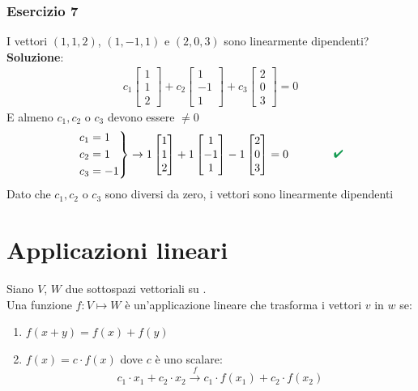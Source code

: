 \documentclass[italian]{article}
\renewcommand{\checkmark}{\textcolor{ForestGreen}{\text{$\qquad$\ding{52}}}}
\newcommand{\ins}[1]{\text{$\mathbb{#1}$}}
\begin{document}
\subsubsection{Esercizio 7}
I vettori $(1,1,2)$, $(1,-1,1)$ e $(2,0,3)$ sono linearmente dipendenti?\\[2mm]
\textbf{Soluzione}:
\begin{gather*}
c_1 
\begin{bmatrix}
	1 \\ 1 \\ 2
\end{bmatrix}
+
c_2
\begin{bmatrix}
	1 \\ -1 \\ 1
\end{bmatrix}
+
c_3
\begin{bmatrix}
	2 \\ 0 \\ 3
\end{bmatrix}
= 0
\end{gather*}
E almeno $c_1,c_2$ o $c_3$ devono essere $\neq 0$
\begin{gather*}
\begin{rcases*}
c_1 = 1\\
c_2 = 1 \\
c_3 = -1
\end{rcases*}
\to
1
\begin{bmatrix}
1 \\ 1 \\ 2
\end{bmatrix}
+
1
\begin{bmatrix}
1 \\ -1 \\ 1
\end{bmatrix}
-1
\begin{bmatrix}
2 \\ 0 \\ 3
\end{bmatrix}
= 0 \qquad \checkmark
\end{gather*}
Dato che $c_1,c_2$ o $c_3$ sono diversi da zero, i vettori sono linearmente dipendenti 

\newpage
\section{Applicazioni lineari}
Siano $V$, $W$ due sottospazi vettoriali su \ins{K}.\\
Una funzione $f: V \longmapsto W$ è un'applicazione lineare che trasforma i vettori $v$ in $w$ se:
\begin{enumerate}
	\item $f(x+y) = f(x) + f(y)$
	\item $f(x) = c\cdot f(x)$ dove $c$ è uno scalare:
			\[
				c_1\cdot x_1 + c_2\cdot x_2 \xrightarrow{f} c_1\cdot f(x_1) + c_2\cdot f(x_2)
			\]
\end{enumerate}
\end{document}

